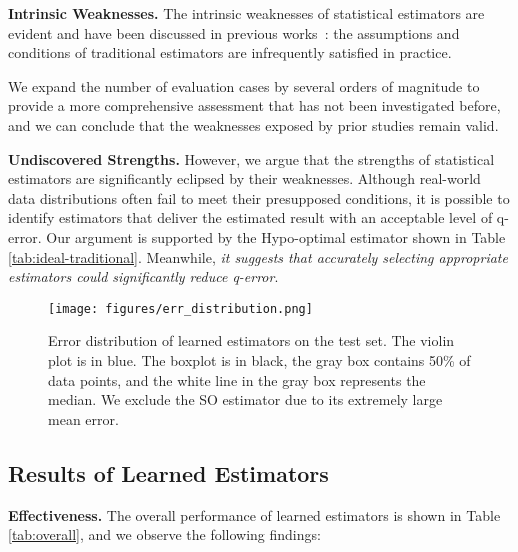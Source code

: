 \noindent\textbf{Intrinsic Weaknesses.} The intrinsic weaknesses of statistical estimators are evident and have been discussed in previous works~\cite{ls_wu2022learning,li2024learning}: the assumptions and conditions of traditional estimators are infrequently satisfied in practice.


We expand the number of evaluation cases by several orders of magnitude to provide a more comprehensive assessment that has not been investigated before, and we can conclude that the weaknesses exposed by prior studies remain valid.



\noindent\textbf{Undiscovered Strengths.} 
However, we argue that the strengths of statistical estimators are significantly eclipsed by their weaknesses. Although real-world data distributions often fail to meet their presupposed conditions, it is possible to identify estimators that deliver the estimated result with an acceptable level of q-error. 
Our argument is supported by the Hypo-optimal estimator shown in Table \ref{tab:ideal-traditional}. 
Meanwhile, \textit{it suggests that accurately selecting appropriate estimators could significantly reduce q-error}.









\begin{figure}
    \texttt{[image: figures/err\_distribution.png]}
    \centering
    \caption{Error distribution of learned estimators on the test set. The violin plot is in blue. The boxplot is in black, the gray box contains 50\% of data points, and the white line in the gray box represents the median. We exclude the SO estimator due to its extremely large mean error.}
    \label{fig:err-distribution}
\end{figure}





\subsection{Results of Learned Estimators}
\label{sec:perf-adandv}

\noindent\textbf{Effectiveness.} The overall performance of learned estimators is shown in Table \ref{tab:overall}, and we observe the following findings:


